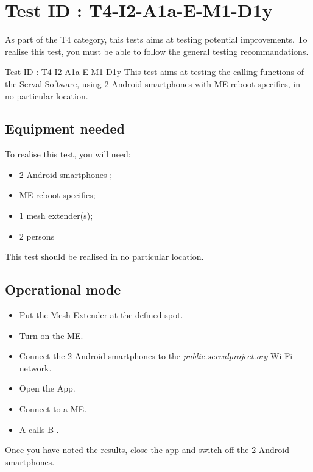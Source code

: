 \documentclass[oneside]{book}
\begin{document}
\section{Test ID : T4-I2-A1a-E-M1-D1y}
\begin{itshape}
As part of the T4 category, this tests aims at testing potential improvements.
To realise this test, you must be able to follow the general testing recommandations. 
\end{itshape}
\newline
Test ID : T4-I2-A1a-E-M1-D1y
 This test aims at testing the calling functions of the Serval Software, using 2 Android smartphones with ME reboot specifics, in no particular location.
\subsection{Equipment needed} To realise this test, you will need:
\begin{itemize}
\item 2 Android smartphones ;
\item ME reboot specifics;
\item 1 mesh extender(s);
\item 2 persons
\end{itemize}
This test should be realised in no particular location.
\subsection{Operational mode} \begin{itemize}
\item Put the Mesh Extender at the defined spot.
\item Turn on the ME.
\item Connect the 2 Android smartphones to the \emph{public.servalproject.org} Wi-Fi network.
\item Open the App.
\item Connect to a ME.
\item A calls B .
\end{itemize}
Once you have noted the results, close the app and switch off the 2 Android smartphones.
\end{document}
